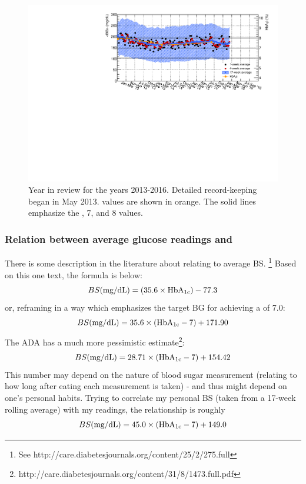 \begin{figure}[htbp]
\begin{center}
\includegraphics[width=6.5in]{figures/year_in_review_2016.pdf}
\caption{Year in review for the years 2013-2016. Detailed record-keeping began in May 2013.
\hbac values are shown in orange. The solid lines emphasize the , 7, and 8 values.
}
\label{fig:year}
\end{center}
\end{figure}

\subsubsection{Relation between average glucose readings and \hbac}
There is some description in the literature about relating \hbac to average BS.
\footnote{See http://care.diabetesjournals.org/content/25/2/275.full}
Based on this one text, the formula is below:
\[
BS(\text{mg/dL})=(35.6 \times \text{HbA}_\text{1c})-77.3
\]
or, reframing in a way which emphasizes the target BG for achieving a \hbac of 7.0:
\[
BS(\text{mg/dL})=35.6\times(\text{HbA}_\text{1c}-7)+171.90
\]
The ADA has a much more pessimistic estimate\footnote{http://care.diabetesjournals.org/content/31/8/1473.full.pdf}:
\[
BS(\text{mg/dL})=28.71\times(\text{HbA}_\text{1c}-7)+154.42
\]
This number may depend on the nature of blood sugar measurement (relating to how long after eating
each measurement is taken) - and thus might depend on one's personal habits. Trying to correlate
my personal BS (taken from a 17-week rolling average) with my \hbac readings, the relationship is
roughly
\[
BS(\text{mg/dL})=45.0\times(\text{HbA}_\text{1c}-7)+149.0
\]

